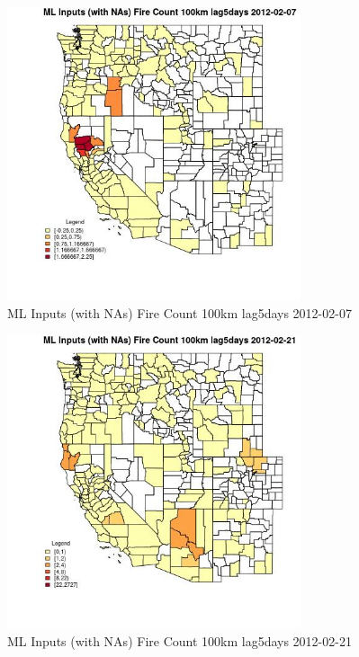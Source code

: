 \begin{figure} 
\centering  
\includegraphics[width=0.77\textwidth]{Code_Outputs/Report_ML_input_PM25_Step4_part_f_de_duplicated_aves_prioritize_24hr_obswNAs_CountyFire_Count_100km_lag5daysMean2012-02-07.jpg} 
\caption{\label{fig:Report_ML_input_PM25_Step4_part_f_de_duplicated_aves_prioritize_24hr_obswNAsCountyFire_Count_100km_lag5daysMean2012-02-07}ML Inputs (with NAs) Fire Count 100km lag5days 2012-02-07} 
\end{figure} 
 

\begin{figure} 
\centering  
\includegraphics[width=0.77\textwidth]{Code_Outputs/Report_ML_input_PM25_Step4_part_f_de_duplicated_aves_prioritize_24hr_obswNAs_CountyFire_Count_100km_lag5daysMean2012-02-21.jpg} 
\caption{\label{fig:Report_ML_input_PM25_Step4_part_f_de_duplicated_aves_prioritize_24hr_obswNAsCountyFire_Count_100km_lag5daysMean2012-02-21}ML Inputs (with NAs) Fire Count 100km lag5days 2012-02-21} 
\end{figure} 
 

